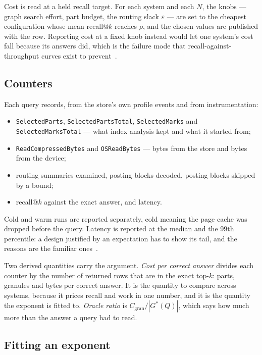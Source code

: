 Cost is read at a held recall target. For each system and each $N$, the knobs
--- graph search effort, part budget, the routing slack $\varepsilon$ --- are
set to the cheapest configuration whose mean recall@$k$ reaches $\rho$, and the
chosen values are published with the row. Reporting cost at a fixed knob
instead would let one system's cost fall because its answers did, which is the
failure mode that recall-against-throughput curves exist to
prevent~\cite{aumuller2020annb}.

\subsection{Counters}

Each query records, from the store's own profile events and from
instrumentation:

\begin{itemize}[leftmargin=*,itemsep=1pt]
\item \texttt{SelectedParts}, \texttt{SelectedPartsTotal},
  \texttt{SelectedMarks} and \texttt{SelectedMarksTotal} --- what index
  analysis kept and what it started from;
\item \texttt{ReadCompressedBytes} and \texttt{OSReadBytes} --- bytes from the
  store and bytes from the device;
\item routing summaries examined, posting blocks decoded, posting blocks
  skipped by a bound;
\item recall@$k$ against the exact answer, and latency.
\end{itemize} Cold and warm runs are reported separately, cold meaning the page
cache was dropped before the query. Latency is reported at the median and the
99th percentile: a design justified by an expectation has to show its tail, and
the reasons are the familiar ones~\cite{dean2013tail}.

Two derived quantities carry the argument. \emph{Cost per correct answer}
divides each counter by the number of returned rows that are in the exact
top-$k$: parts, granules and bytes per correct answer. It is the quantity to
compare across systems, because it prices recall and work in one number, and it
is the quantity the exponent is fitted to. \emph{Oracle ratio} is
$C_{\mathrm{gran}}/|G^{*}(Q)|$, which says how much more than the answer a query
had to read.

\subsection{Fitting an exponent}

